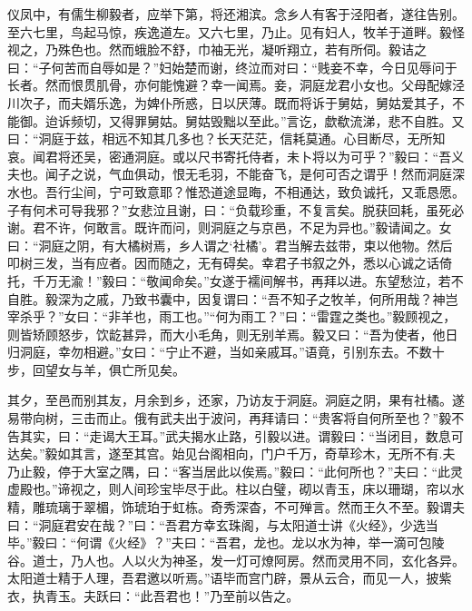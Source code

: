 \documentclass[UTF8,titlepage,oneside]{ctexbook}
\begin{document}
仪凤中，有儒生柳毅者，应举下第，将还湘滨。念乡人有客于泾阳者，遂往告别。至六七里，鸟起马惊，疾逸道左。又六七里，乃止。见有妇人，牧羊于道畔。毅怪视之，乃殊色也。然而蛾脸不舒，巾袖无光，凝听翔立，若有所伺。毅诘之曰：“子何苦而自辱如是？”妇始楚而谢，终泣而对曰：“贱妾不幸，今日见辱问于长者。然而恨贯肌骨，亦何能愧避？幸一闻焉。妾，洞庭龙君小女也。父母配嫁泾川次子，而夫婿乐逸，为婢仆所惑，日以厌薄。既而将诉于舅姑，舅姑爱其子，不能御。迨诉频切，又得罪舅姑。舅姑毁黜以至此。”言讫，歔欷流涕，悲不自胜。又曰：“洞庭于兹，相远不知其几多也？长天茫茫，信耗莫通。心目断尽，无所知哀。闻君将还吴，密通洞庭。或以尺书寄托侍者，未卜将以为可乎？”毅曰：“吾义夫也。闻子之说，气血俱动，恨无毛羽，不能奋飞，是何可否之谓乎！然而洞庭深水也。吾行尘间，宁可致意耶？惟恐道途显晦，不相通达，致负诚托，又乖恳愿。子有何术可导我邪？”女悲泣且谢，曰：“负载珍重，不复言矣。脱获回耗，虽死必谢。君不许，何敢言。既许而问，则洞庭之与京邑，不足为异也。”毅请闻之。女曰：“洞庭之阴，有大橘树焉，乡人谓之‘社橘’。君当解去兹带，束以他物。然后叩树三发，当有应者。因而随之，无有碍矣。幸君子书叙之外，悉以心诚之话倚托，千万无渝！”毅曰：“敬闻命矣。”女遂于襦间解书，再拜以进。东望愁泣，若不自胜。毅深为之戚，乃致书囊中，因复谓曰：“吾不知子之牧羊，何所用哉？神岂宰杀乎？”女曰：“非羊也，雨工也。”“何为雨工？”曰：“雷霆之类也。”毅顾视之，则皆矫顾怒步，饮龁甚异，而大小毛角，则无别羊焉。毅又曰：“吾为使者，他日归洞庭，幸勿相避。”女曰：“宁止不避，当如亲戚耳。”语竟，引别东去。不数十步，回望女与羊，俱亡所见矣。

其夕，至邑而别其友，月余到乡，还家，乃访友于洞庭。洞庭之阴，果有社橘。遂易带向树，三击而止。俄有武夫出于波问，再拜请曰：“贵客将自何所至也？”毅不告其实，曰：“走谒大王耳。”武夫揭水止路，引毅以进。谓毅曰：“当闭目，数息可达矣。”毅如其言，遂至其宫。始见台阁相向，门户千万，奇草珍木，无所不有.夫乃止毅，停于大室之隅，曰：“客当居此以俟焉。”毅曰：“此何所也？”夫曰：“此灵虚殿也。”谛视之，则人间珍宝毕尽于此。柱以白璧，砌以青玉，床以珊瑚，帘以水精，雕琉璃于翠楣，饰琥珀于虹栋。奇秀深杳，不可殚言。然而王久不至。毅谓夫曰：“洞庭君安在哉？”曰：“吾君方幸玄珠阁，与太阳道士讲《火经》，少选当毕。”毅曰：“何谓《火经》？”夫曰：“吾君，龙也。龙以水为神，举一滴可包陵谷。道士，乃人也。人以火为神圣，发一灯可燎阿房。然而灵用不同，玄化各异。太阳道士精于人理，吾君邀以听焉。”语毕而宫门辟，景从云合，而见一人，披紫衣，执青玉。夫跃曰：“此吾君也！”乃至前以告之。
\end{document}
